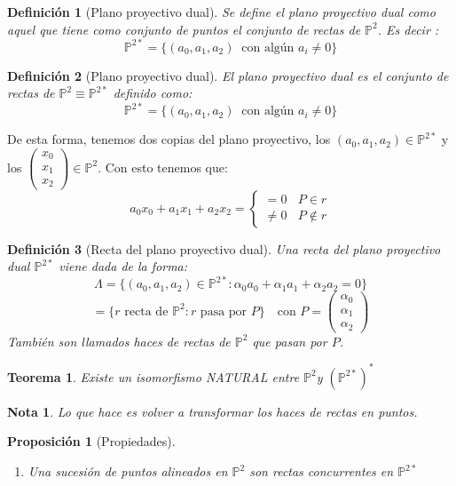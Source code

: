 \documentclass[11pt, a4paper]{article}
\newif\IfInSansMode
\theoremstyle{theorem-style}
\newtheorem{nth}{Teorema}[section]
\newtheorem{nprop}{Proposición}[section]
\theoremstyle{definition-style}
\newtheorem{ndef}{Definición}[section]
\theoremstyle{remark-style}
\newtheorem*{nota}{Nota}
\theoremstyle{example-style}
\newenvironment{nlist}
{\begin{enumerate}
    \renewcommand\labelenumi{(\emph{\roman{enumi})}}}
  {\end{enumerate}}
\begin{document}
\begin{ndef}[Plano proyectivo dual]
	Se define el plano proyectivo dual como aquel que tiene como conjunto de puntos el conjunto de rectas de $\mathbb{P}^2$. Es decir :
	$$\mathbb{P}^{2*} = \{ (a_0,a_1,a_2) \ \text{ con algún $a_i\ne 0$}\}$$
\end{ndef}

\begin{ndef}[Plano proyectivo dual]
	El plano proyectivo dual es el conjunto de rectas de $\mathbb P ^2 \equiv \mathbb P^{2*}$ definido como:
	\[
	\mathbb P^{2*} = \{ (a_0,a_1,a_2) \ \text{ con algún $a_i\ne 0$}\}
	\]
\end{ndef}
De esta forma, tenemos dos copias del plano proyectivo, los $(a_0,a_1,a_2)\in \mathbb P^{2*}$ y los $\begin{pmatrix}
 x_0\\
 x_1\\
 x_2
\end{pmatrix}  \in \mathbb P ^2$. Con esto tenemos que:
\[
a_0 x_0 + a_1x_1 + a_2x_2 = \begin{cases}
	=0 \ \ \ \ P \in r\\
	\ne 0 \ \ \ \ P \notin r
\end{cases}
\]

\begin{ndef}[Recta del plano proyectivo dual]
	Una recta del plano proyectivo dual $\mathbb P^{2*}$ viene dada de la forma:
	\[
	\Lambda = \{ (a_0, a_1,a_2) \in \mathbb P^{2*} : \alpha_0a_0 + \alpha_1 a_1 + \alpha_2 a_2 = 0\}
	\]
	\[
	= \{ r \text{ recta de } \mathbb P ^2  : r \text { pasa por } P\} \ \ \ \text{ con } P = \begin{pmatrix}
 \alpha_0\\
 \alpha_1\\
 \alpha_2
\end{pmatrix} 
	\]
	También son llamados haces de rectas de $\mathbb P^2$ que pasan por $P$.
\end{ndef}

\begin{nth}
	Existe un isomorfismo NATURAL entre $\mathbb P^2 $y $(\mathbb P^{2*})^*$
\end{nth}
\begin{nota}
	Lo que hace es volver a transformar los haces de rectas en puntos.
\end{nota}

\begin{nprop}[Propiedades]
	\begin{nlist}
	\item Una sucesión de puntos alineados en $\mathbb P^2$ son rectas concurrentes en $\mathbb P^{2*}$
\end{nlist}
\end{nprop}
\end{document}
